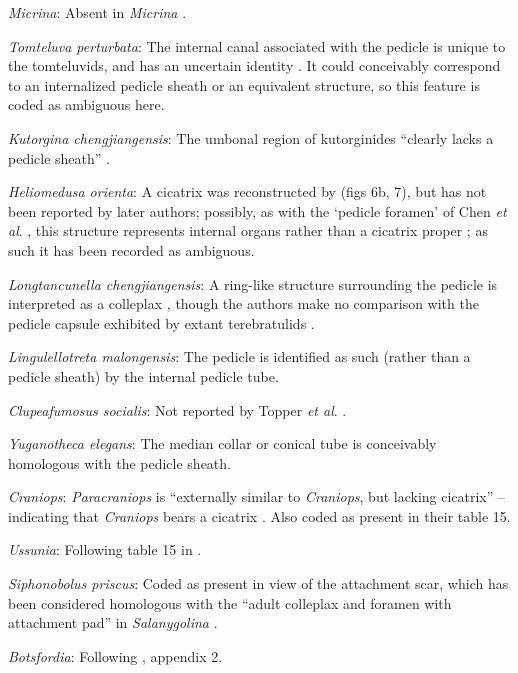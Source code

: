 \documentclass[openany]{book}
\theoremstyle{definition}
\theoremstyle{definition}
\theoremstyle{definition}
\theoremstyle{remark}
\begin{document}
\emph{Micrina}: Absent in \emph{Micrina} \citep{Holmer2011Firstrecord}.

\emph{Tomteluva perturbata}: The internal canal associated with the
pedicle is unique to the tomteluvids, and has an uncertain identity
\citep{Streng2016Anew}. It could conceivably correspond to an
internalized pedicle sheath or an equivalent structure, so this feature
is coded as ambiguous here.

\emph{Kutorgina chengjiangensis}: The umbonal region of kutorginides
``clearly lacks a pedicle sheath'' \citep{Holmer2018Theattachment}.

\emph{Heliomedusa orienta}: A cicatrix was reconstructed by
\citet{Jin1992Revisionof} (figs 6b, 7), but has not been reported by
later authors; possibly, as with the `pedicle foramen' of Chen \emph{et
al}. \citeyearpar{Chen2007Reinterpretationof}, this structure represents
internal organs rather than a cicatrix proper
\citep{Zhang2009Architectureand}; as such it has been recorded as
ambiguous.

\emph{Longtancunella chengjiangensis}: A ring-like structure surrounding
the pedicle is interpreted as a colleplax
\citep{Zhang2011Theexceptionally}, though the authors make no comparison
with the pedicle capsule exhibited by extant terebratulids
\citep[see][]{Holmer2018Evolutionarysignificance}.

\emph{Lingulellotreta malongensis}: The pedicle is identified as such
(rather than a pedicle sheath) by the internal pedicle tube.

\emph{Clupeafumosus socialis}: Not reported by Topper \emph{et al}.
\citeyearpar{Topper2013Reappraisalof}.

\emph{Yuganotheca elegans}: The median collar or conical tube is
conceivably homologous with the pedicle sheath.

\emph{Craniops}: \emph{Paracraniops} is ``externally similar to
\emph{Craniops}, but lacking cicatrix'' -- indicating that
\emph{Craniops} bears a cicatrix
\citep{Williams2000BrachiopodaLinguliformea}. Also coded as present in
their table 15.

\emph{Ussunia}: Following table 15 in
\citet{Williams2000BrachiopodaLinguliformea}.

\emph{Siphonobolus priscus}: Coded as present in view of the attachment
scar, which has been considered homologous with the ``adult colleplax
and foramen with attachment pad'' in \emph{Salanygolina}
\citep{Popov2009Earlyontogeny}.

\emph{Botsfordia}: Following \citet{Williams1998Thediversity}, appendix
2.
\end{document}
